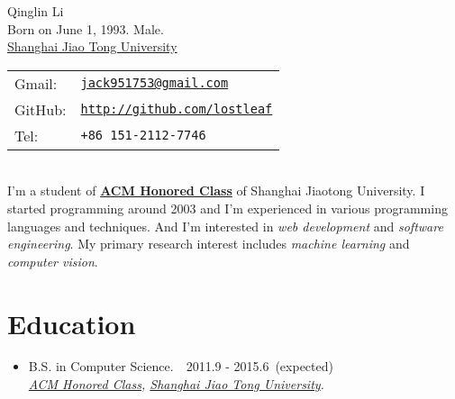 \documentclass[letterpaper]{article}
\def\name{Qinglin Li}
\begin{document}
\begin{minipage}{0.4\linewidth}
  {\huge \name }
  \vspace{0.1in} \\
  Born on June 1, 1993. Male. \\
  \href{http://www.sjtu.edu.cn/}{Shanghai Jiao Tong University}
\end{minipage}
\begin{minipage}{0.45\linewidth}
  \begin{tabular}{ll}
    Gmail:  & \href{mailto:jack951753@gmail.com}{\tt jack951753@gmail.com} \\
    GitHub: & \href{https://github.com/lostleaf}{\tt http://github.com/lostleaf} \\
    Tel:    & {\tt +86 151-2112-7746}
  \end{tabular}
\end{minipage}

~\\
I'm a student of \textbf{\href{http://acm.sjtu.edu.cn}{ACM Honored Class}} of Shanghai Jiaotong University.
I started programming around 2003 and I'm experienced in various programming languages and techniques.
And I'm interested in \emph{web development} and \emph{software engineering}.
My primary research interest includes \emph{machine learning} and \emph{computer vision}.
\section*{Education}
\begin{itemize}

\item  B.S. in Computer Science.~\quad\qquad~2011.9 - 2015.6~(expected) \\
    \emph{\href{http://acm.sjtu.edu.cn}{ACM Honored Class},
    \href{http://www.sjtu.edu.cn/}{Shanghai Jiao Tong University}.}
\end{itemize}
\end{document}
